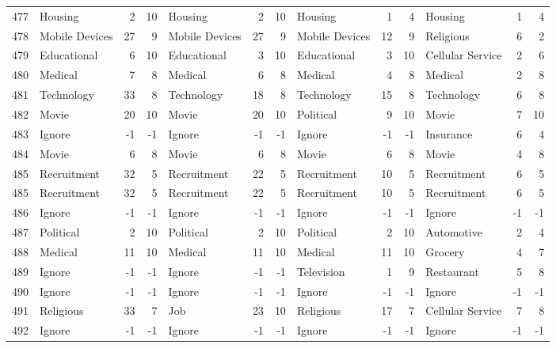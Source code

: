 \begin{figure}[htbp]
\begin{tabular}{rlrrlrrlrrlrr}
    477   & Housing & 2     & 10    & Housing & 2     & 10    & Housing & 1     & 4     & Housing & 1     & 4 \\
    478   & Mobile Devices & 27    & 9     & Mobile Devices & 27    & 9     & Mobile Devices & 12    & 9     & Religious & 6     & 2 \\
    479   & Educational & 6     & 10    & Educational & 3     & 10    & Educational & 3     & 10    & Cellular Service & 2     & 6 \\
    480   & Medical & 7     & 8     & Medical & 6     & 8     & Medical & 4     & 8     & Medical & 2     & 8 \\
    481   & Technology & 33    & 8     & Technology & 18    & 8     & Technology & 15    & 8     & Technology & 6     & 8 \\
    482   & Movie & 20    & 10    & Movie & 20    & 10    & Political & 9     & 10    & Movie & 7     & 10 \\
    483   & Ignore & -1    & -1    & Ignore & -1    & -1    & Ignore & -1    & -1    & Insurance & 6     & 4 \\
    484   & Movie & 6     & 8     & Movie & 6     & 8     & Movie & 6     & 8     & Movie & 4     & 8 \\
    485   & Recruitment & 32    & 5     & Recruitment & 22    & 5     & Recruitment & 10    & 5     & Recruitment & 6     & 5 \\
    485   & Recruitment & 32    & 5     & Recruitment & 22    & 5     & Recruitment & 10    & 5     & Recruitment & 6     & 5 \\
    486   & Ignore & -1    & -1    & Ignore & -1    & -1    & Ignore & -1    & -1    & Ignore & -1    & -1 \\
    487   & Political & 2     & 10    & Political & 2     & 10    & Political & 2     & 10    & Automotive & 2     & 4 \\
    488   & Medical & 11    & 10    & Medical & 11    & 10    & Medical & 11    & 10    & Grocery & 4     & 7 \\
    489   & Ignore & -1    & -1    & Ignore & -1    & -1    & Television & 1     & 9     & Restaurant & 5     & 8 \\
    490   & Ignore & -1    & -1    & Ignore & -1    & -1    & Ignore & -1    & -1    & Ignore & -1    & -1 \\
    491   & Religious & 33    & 7     & Job   & 23    & 10    & Religious & 17    & 7     & Cellular Service & 7     & 8 \\
    492   & Ignore & -1    & -1    & Ignore & -1    & -1    & Ignore & -1    & -1    & Ignore & -1    & -1 \\

\end{tabular}
\end{figure}
